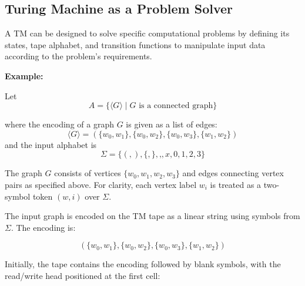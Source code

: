 \documentclass[12pt,a4paper,openany]{article}
\begin{document}
\subsection{Turing Machine as a Problem Solver}

A TM can be designed to solve specific computational problems by defining its states, tape alphabet, and transition functions to manipulate input data according to the problem's requirements.

\textbf{Example:}

Let
\[
A = \{\langle G \rangle \mid G \text{ is a connected graph}\}
\]

where the encoding of a graph $G$ is given as a list of edges:
\[
\langle G \rangle = (\{w_0,w_1\}, \{w_0,w_2\}, \{w_0,w_3\}, \{w_1,w_2\})
\]
and the input alphabet is
\[
\Sigma = \{ (, ), \{, \}, \text{,}, x, 0, 1, 2, 3 \}
\]

The graph $G$ consists of vertices $\{w_0, w_1, w_2, w_3\}$ and edges connecting
vertex pairs as specified above. For clarity, each vertex label $w_i$ is treated
as a two-symbol token $(w, i)$ over $\Sigma$.

\begin{center}
\end{center}

The input graph is encoded on the TM tape as a linear string using symbols
from $\Sigma$. The encoding is:

\[
(\{w_0,w_1\},\{w_0,w_2\},\{w_0,w_3\},\{w_1,w_2\})
\]

Initially, the tape contains the encoding followed by blank symbols, with the
read/write head positioned at the first cell:

\begin{center}
\end{center}
\end{document}
